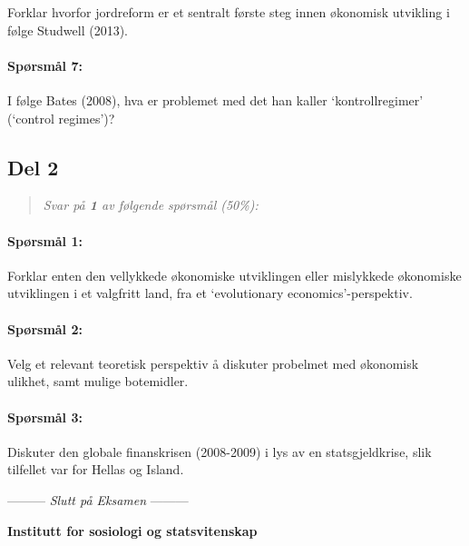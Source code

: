 \documentclass[a4paper,12pt,fleqn]{article}
\newcommand{\institusjon}{Institutt for sosiologi og statsvitenskap}
\newcommand{\sisteord}{Slutt på Eksamen}
\begin{document}
Forklar hvorfor jordreform er et sentralt første steg innen økonomisk utvikling
i følge Studwell (2013).

\paragraph{\textbf{Spørsmål 7:}}

I følge Bates (2008), hva er problemet med det han kaller `kontrollregimer' (`control
regimes')?

\bigskip
\subsection*{Del 2}
\begin{quote}
	\textit{Svar på \textbf{1} av følgende spørsmål (50\%):}
\end{quote}

\paragraph{\textbf{Spørsmål 1:}}

Forklar enten den vellykkede økonomiske utviklingen eller mislykkede økonomiske
utviklingen i et valgfritt land, fra et `evolutionary economics'-perspektiv.

\paragraph{\textbf{Spørsmål 2:}}

Velg et relevant teoretisk perspektiv å diskuter probelmet med økonomisk
ulikhet, samt mulige botemidler.

\paragraph{\textbf{Spørsmål 3:}}

Diskuter den globale finanskrisen (2008-2009) i lys av en statsgjeldkrise, slik
tilfellet var for Hellas og Island.

\begin{center}
\vspace{3cm}
--------- \textit{\sisteord} ---------
\end{center}

\clearpage

\begin{center}
\large\textbf{\institusjon}
\end{center}
\vspace{.5cm}
\end{document}
